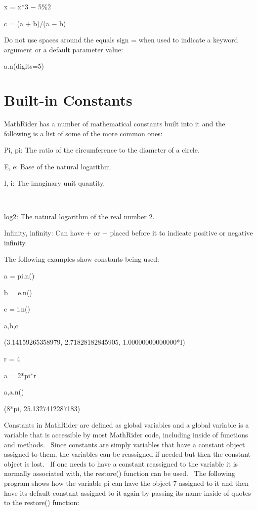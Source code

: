 \documentclass[12pt,twoside]{book}
\begin{document}
x = x*3 $-$ 5\%2

c = (a + b)/(a $-$ b)


\bigskip

Do not use spaces around the equals sign {\textquotesingle}={\textquotesingle} when used to indicate a keyword argument or a default parameter value:

a.n(digits=5)

\section[Built{}-in Constants]{Built{}-in Constants}

MathRider has a number of mathematical constants built into it and the following is a list of some of the more common ones: 

\bigskip

Pi, pi: The ratio of the circumference to the diameter of a circle.


\bigskip

E, e: Base of the natural logarithm.


\bigskip

I, i: The imaginary unit quantity.

\ \ \ \ \ 

log2: The natural logarithm of the real number 2.


\bigskip

Infinity, infinity: Can have + or $-$ placed before it to indicate positive or negative infinity. 

\bigskip

The following examples show constants being used:


\bigskip

a = pi.n()

b = e.n()

c = i.n()

a,b,c

{\textbar}

(3.14159265358979, 2.71828182845905, 1.00000000000000*I)


\bigskip

r = 4

a = 2*pi*r

a,a.n()

{\textbar}

(8*pi, 25.1327412287183)

Constants in MathRider are defined as global variables and a global variable is a variable that is accessible by most MathRider code, including inside of functions and methods. \ Since constants are simply variables that have a constant object assigned to them, the variables can be reassigned if needed but then the constant object is lost. \ If one needs to have a constant reassigned to the variable it is normally associated with, the restore() function can be used. \ The following program shows how the variable pi can have the object 7 assigned to it and then have its default constant assigned to it again by passing its name inside of quotes to the restore() function: 
\end{document}
